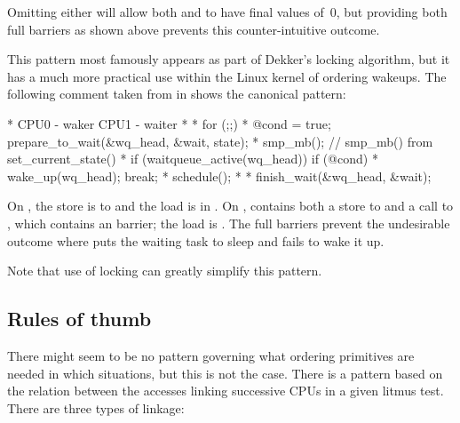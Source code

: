Omitting either  will allow both  and  to have final
values of~0, but providing both full barriers as shown above prevents
this counter-intuitive outcome.

This pattern most famously appears as part of Dekker's locking
algorithm, but it has a much more practical use within the Linux kernel
of ordering wakeups.
The following comment taken from  in
 shows the canonical pattern:

\begin{VerbatimU}
* CPU0 - waker                    CPU1 - waiter
*
*                                 for (;;) {
* @cond = true;                     prepare_to_wait(&wq_head, &wait, state);
* smp_mb();                         // smp_mb() from set_current_state()
* if (waitqueue_active(wq_head))         if (@cond)
*   wake_up(wq_head);                      break;
*                                   schedule();
*                                 }
*                                 finish_wait(&wq_head, &wait);
\end{VerbatimU}

On , the store is to  and the load is in .
On ,  contains both a store to 
and a call to , which contains an  barrier;
the load is .
The full barriers prevent the undesirable outcome where  puts the
waiting task to sleep and  fails to wake it up.

Note that use of locking can greatly simplify this pattern.


\subsection{Rules of thumb}

There might seem to be no pattern governing what ordering primitives are
needed in which situations, but this is not the case.
There is a pattern based on the relation between the accesses linking
successive CPUs in a given litmus test.
There are three types of linkage:

